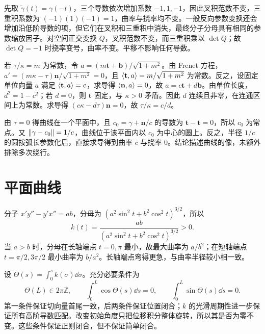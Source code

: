 \begin{solve}
先取 $\widetilde\gamma(t)=\gamma(-t)$，三个导数依次增加系数 $-1,1,-1$，因此叉积范数不变，三重积系数为 $(-1)(1)(-1)=1$，曲率与挠率均不变。一般反向参数变换还会增加沿低阶导数的项，但它们在叉积和三重积中消失，最终分子分母具有相同的参数缩放因子。对空间正交变换 $Q$，叉积范数不变，而三重积乘以 $\det Q$；故 $\det Q=-1$ 时挠率变号，曲率不变。平移不影响任何导数。
\end{solve}

\begin{solve}
若 $\tau/\kappa=m$ 为常数，令 $a=(m\mathbf t+\mathbf b)/\sqrt{1+m^2}$。由 Frenet 方程，$a'=(m\kappa-\tau)\mathbf n/\sqrt{1+m^2}=0$，且 $\langle \mathbf t,a\rangle=m/\sqrt{1+m^2}$ 为常数。反之，设固定单位向量 $a$ 满足 $\langle \mathbf t,a\rangle=c$，求导得 $\langle \mathbf n,a\rangle=0$，故 $a=c\mathbf t+d\mathbf b$。由单位长度，$d^2=1-c^2$；若 $d=0$，则 $\mathbf t$ 固定，与 $\kappa>0$ 矛盾。因此 $d$ 连续且非零，在连通区间上为常数。求导得 $(c\kappa-d\tau)\mathbf n=0$，故 $\tau/\kappa=c/d$。
\end{solve}

\begin{solve}
由 $\tau=0$ 得曲线在一个平面中，且 $c_0=\gamma+\mathbf n/c$ 的导数为 $\mathbf t-\mathbf t=0$，所以 $c_0$ 为常点。又 $\lVert \gamma-c_0\rVert=1/c$，曲线位于该平面内以 $c_0$ 为中心的圆上。反之，半径 $1/c$ 的圆按弧长参数化后，直接求导得到曲率 $c$ 与挠率 $0$。结论描述曲线的像，未额外排除多次绕行。
\end{solve}

\section{平面曲线}
\begin{solve}
分子 $x'y''-y'x''=ab$，分母为 $(a^2\sin^2t+b^2\cos^2t)^{3/2}$，所以
\[
 k(t)=\frac{ab}{(a^2\sin^2t+b^2\cos^2t)^{3/2}}>0.
\]
当 $a>b$ 时，分母在长轴端点 $t=0,\pi$ 最小，故最大曲率为 $a/b^2$；在短轴端点 $t=\pi/2,3\pi/2$ 最小曲率为 $b/a^2$。长轴端点弯得更急，与曲率半径较小相一致。
\end{solve}

\begin{solve}
设 $\Theta(s)=\int_0^s k(\sigma)\dd\sigma$。充分必要条件为
\[
 \Theta(L)\in2\pi\mathbb Z,\qquad
 \int_0^L\cos\Theta(s)\dd s=0,\qquad
 \int_0^L\sin\Theta(s)\dd s=0.
\]
第一条件保证切向量首尾一致，后两条件保证位置闭合；$k$ 的光滑周期性进一步保证所有高阶导数匹配。改变初始角度只把位移积分整体旋转，所以其是否为零不变。这些条件保证正则闭合，但不保证简单闭合。
\end{solve}


